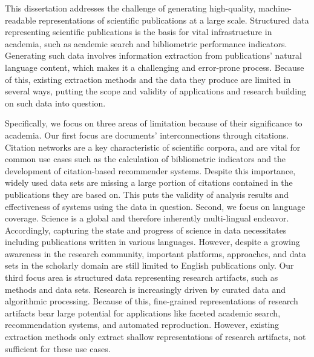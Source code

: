 \Abstract{}
This dissertation addresses the challenge of generating high-quality, machine-readable representations of scientific publications at a large scale.
Structured data representing scientific publications is the basis for vital infrastructure in academia, such as academic search and bibliometric performance indicators. %
Generating such data involves information extraction from publications' natural language content, which makes it a challenging and error-prone process.
Because of this, existing extraction methods and the data they produce are limited in several ways, %
putting the scope and validity of applications and research building on such data into question.

Specifically,
we focus on three areas of limitation because of their significance to academia.
Our first focus are documents' interconnections through citations.
Citation networks are a key characteristic of scientific corpora, and are vital for common use cases such as the calculation of bibliometric indicators and the development of citation-based recommender systems. Despite this importance, widely used data sets %
are missing a large portion of citations contained in the publications they are based on.
This puts the validity of analysis results and effectiveness of systems using the data in question.
Second, we focus on language coverage.
Science is a global and therefore inherently multi-lingual endeavor. Accordingly, capturing the state and progress of science in data necessitates including publications written in various languages. However, despite a growing awareness in the
research community, important platforms, approaches, and data sets in the scholarly domain are still limited to English publications only. %
Our third focus area is structured data representing research artifacts, such as methods and data sets. Research is increasingly driven by curated data and algorithmic processing. Because of this, fine-grained representations of research artifacts bear large potential for applications like faceted academic search, recommendation systems, and automated reproduction. However, existing extraction methods only extract shallow representations of research artifacts, not sufficient for these use cases.

